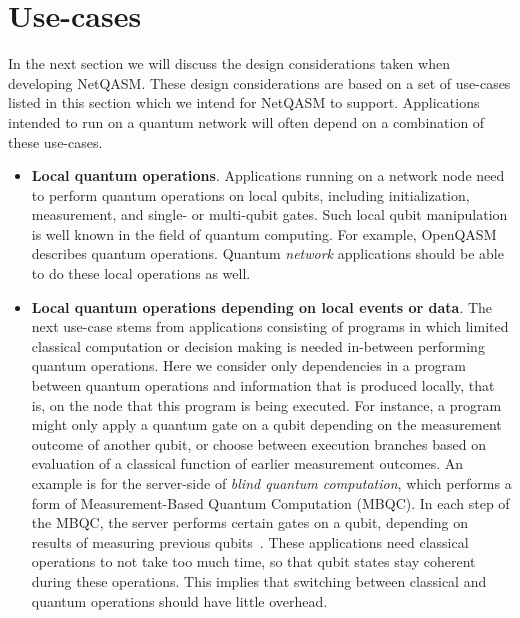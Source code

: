 \section{Use-cases}
\label{netqasm:sec:use_cases}
In the next section we will discuss the design considerations taken when developing \ac{NetQASM}.
These design considerations are based on a set of use-cases listed in this section which we intend for \ac{NetQASM} to support.
Applications intended to run on a quantum network will often depend on a combination of these use-cases.

\begin{itemize}
      \item \textbf{Local quantum operations}.
            Applications running on a network node need to perform quantum operations on local qubits, including initialization, measurement, and single- or multi-qubit gates.
            Such local qubit manipulation is well known in the field of quantum computing. For example, OpenQASM~\cite{cross2017openqasm} describes quantum operations.
            Quantum \textit{network} applications should be able to do these local operations as well.

      \item \textbf{Local quantum operations depending on local events or data}.
            The next use-case stems from applications consisting of programs in which limited classical computation or decision making is needed in-between performing quantum operations.
            Here we consider only dependencies in a program between quantum operations and information that is produced locally, that is, on the node that this program is being executed.
            For instance, a program might only apply a quantum gate on a qubit depending on the measurement outcome of another qubit, or choose between execution branches based on evaluation of a classical function of earlier measurement outcomes.
            An example is for the server-side of \textit{blind quantum computation}, which performs a form of Measurement-Based Quantum Computation (MBQC).
            In each step of the MBQC, the server performs certain gates on a qubit, depending on results of measuring previous qubits~\cite{fitzsimons2017private}.
            These applications need classical operations to not take too much time, so that qubit states stay coherent during these operations.
            This implies that switching between classical and quantum operations should have little overhead.


\end{itemize}
